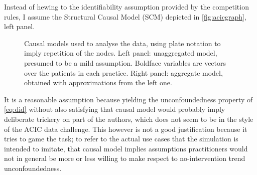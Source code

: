 \documentclass[a4paper]{article}
\theoremstyle{definition}
\let\oldmarginpar\marginpar
\renewcommand{\marginpar}[1]{\oldmarginpar{\sffamily\scriptsize #1}}
\begin{document}
    Instead of hewing to the identifiability assumption provided by the competition rules, I assume the Structural Causal Model (SCM) \autocite{pearl2009} depicted in \autoref{fig:acicgraph}, left panel.
    \begin{figure}
        \hfill
        \caption{\label{fig:acicgraph} Causal models used to analyse the data, using plate notation to imply repetition of the nodes. Left panel: unaggregated model, presumed to be a mild assumption. Boldface variables are vectors over the patients in each practice. Right panel: aggregate model, obtained with approximations from the left one.}
    \end{figure}
    It is a reasonable assumption because yielding the unconfoundedness property of \autoref{eq:did} without also satisfying that causal model would probably imply deliberate trickery on part of the authors, which does not seem to be in the style of the ACIC data challenge. This however is not a good justification because it tries to game the task; to refer to the actual use cases that the simulation is intended to imitate, that causal model implies assumptions practitioners\marginpar{Maybe ask Mealli about this.} would not in general be more or less willing to make respect to no-intervention trend unconfoundedness.
\end{document}
